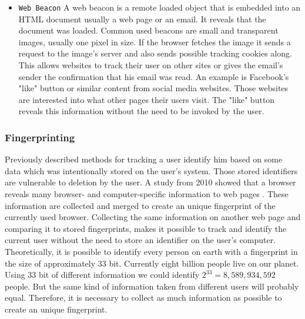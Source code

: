 \begin{itemize}
				\item \texttt{Web Beacon} A web beacon is a remote loaded object that is embedded into an HTML document usually a web page or an email. It reveals that the document was loaded. Common used beacons are small and transparent images, usually one pixel in size. If the browser fetches the image it sends a request to the image's server and also sends possible tracking cookies along. This allows websites to track their user on other sites or gives the email's sender the confirmation that his email was read. An example is Facebook's "like" button or similar content from social media websites. Those websites are interested into what other pages their users visit. The "like" button reveals this information without the need to be invoked by the user. 
			\end{itemize}
			
		\subsubsection{Fingerprinting}
			
			Previously described methods for tracking a user identify him based on some data which was intentionally stored on the user's system. Those stored identifiers are vulnerable to deletion by the user. A study from 2010 showed that a browser reveals many browser- and computer-specific information to web pages \cite{Eckersley:2010:UYW:1881151.1881152}. These information are collected and merged to create an unique fingerprint of the currently used browser. Collecting the same information on another web page and comparing it to stored fingerprints, makes it possible to track and identify the current user without the need to store an identifier on the user's computer. Theoretically, it is possible to identify every person on earth with a fingerprint in the size of approximately 33 bit. Currently eight billion people live on our planet. Using 33 bit of different information we could identify $2^{33}=8,589,934,592$ people. But the same kind of information taken from different users will probably equal. Therefore, it is necessary to collect as much information as possible to create an unique fingerprint. \\
			
